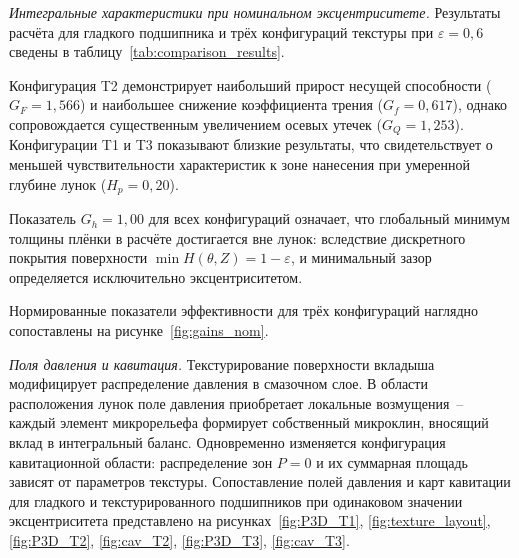 \textit{Интегральные характеристики при номинальном эксцентриситете.}
Результаты расчёта для гладкого подшипника и трёх конфигураций
текстуры при $\varepsilon = 0{,}6$ сведены в
таблицу~\ref{tab:comparison_results}.

\begin{table}[!ht]
\centering
\caption{Интегральные характеристики подшипников при $\varepsilon = 0{,}6$}
\label{tab:comparison_results}
\end{table}

\FloatBarrier

Конфигурация T2 демонстрирует наибольший прирост несущей
способности ($G_F = 1{,}566$) и наибольшее снижение коэффициента
трения ($G_f = 0{,}617$), однако сопровождается существенным
увеличением осевых утечек ($G_Q = 1{,}253$). Конфигурации T1 и T3
показывают близкие результаты, что свидетельствует о меньшей
чувствительности характеристик к зоне нанесения при умеренной
глубине лунок ($H_p = 0{,}20$).

Показатель $G_h = 1{,}00$ для всех конфигураций означает, что
глобальный минимум толщины плёнки в расчёте достигается вне лунок:
вследствие дискретного покрытия поверхности $\min H(\theta,Z)
= 1 - \varepsilon$, и минимальный зазор определяется исключительно
эксцентриситетом.

Нормированные показатели эффективности для трёх конфигураций
наглядно сопоставлены на рисунке~\ref{fig:gains_nom}.

\textit{Поля давления и кавитация.}
Текстурирование поверхности вкладыша модифицирует распределение
давления в смазочном слое. В области расположения лунок поле
давления приобретает локальные возмущения~-- каждый элемент
микрорельефа формирует собственный микроклин, вносящий вклад
в интегральный баланс. Одновременно изменяется конфигурация
кавитационной области: распределение зон $P = 0$ и их суммарная
площадь зависят от параметров текстуры. Сопоставление
полей давления и карт кавитации для гладкого
и текстурированного подшипников при одинаковом значении
эксцентриситета представлено на
рисунках~\ref{fig:P3D_T1}, \ref{fig:texture_layout}, \ref{fig:P3D_T2}, \ref{fig:cav_T2}, \ref{fig:P3D_T3}, \ref{fig:cav_T3}.

